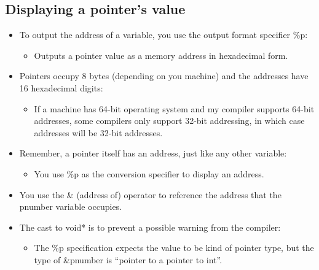 \subsection{Displaying a pointer's value}
\begin{itemize}
    \item To output the address of a variable, you use the output format specifier \%p:
        \begin{itemize}
            \item Outputs a pointer value as a memory address in hexadecimal form.
        \end{itemize}
    
    \item Pointers occupy 8 bytes (depending on you machine) and the addresses have 16 hexadecimal digits:
        \begin{itemize}
            \item If a machine has 64-bit operating system and my compiler supports 64-bit addresses, some compilers only support 32-bit addressing, in which case addresses will be 32-bit addresses. 
        \end{itemize}
    
    \item Remember, a pointer itself has an address, just like any other variable:
        \begin{itemize}
            \item You use \%p as the conversion specifier to display an address. 
        \end{itemize}
    
    \item You use the \& (address of) operator to reference the address that the pnumber variable occupies.
    \item The cast to void* is to prevent a possible warning from the compiler: 
        \begin{itemize}
            \item The \%p specification expects the value to be kind of pointer type, but the type of \&pnumber is ``pointer to a pointer to int''.
        \end{itemize}
\end{itemize}

